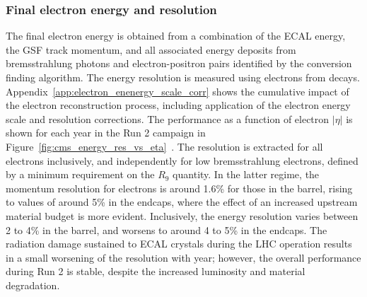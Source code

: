 \subsubsection{Final electron energy and resolution}

The final electron energy is obtained from a combination of the ECAL energy, the GSF track momentum, and all associated energy deposits from bremsstrahlung photons and electron-positron pairs identified by the conversion finding algorithm. 
The energy resolution is measured using electrons from \Zee decays. Appendix~\ref{app:electron_enenergy_scale_corr} shows the cumulative impact of the electron reconstruction process, including application of the electron energy scale and resolution corrections. The performance as a function of electron $|\eta|$ is shown for each year in the Run 2 campaign in Figure~\ref{fig:cms_energy_res_vs_eta}~\cite{Run2_ECAL_plots,CMS_egamma_performance}. The resolution is extracted for all electrons inclusively, and independently for low bremsstrahlung electrons, defined by a minimum requirement on the $R_{9}$ quantity. In the latter regime, the momentum resolution for electrons is around 1.6\% for those in the barrel, rising to values of around 5\% in the endcaps, where the effect of an increased upstream material budget is more evident. Inclusively, the energy resolution varies between 2 to 4\% in the barrel, and worsens to around 4 to 5\% in the endcaps. The radiation damage sustained to ECAL crystals during the LHC operation results in a small worsening of the resolution with year; however, the overall performance during Run 2 is stable, despite the increased luminosity and material degradation. 


